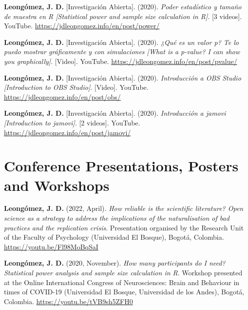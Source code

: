 \documentclass[11pt,a4paper,]{awesome-cv}
\begin{document}
\leavevmode{}%
\textbf{Leongómez, J. D.} {[}Investigación Abierta{]}. (2020).
\emph{{Poder estadístico y tamaño de muestra en R {[}Statistical power
and sample size calculation in R{]}}}. {[}3 videos{]}. YouTube.
\url{https://jdleongomez.info/en/post/power/}

\leavevmode{}%
\textbf{Leongómez, J. D.} {[}Investigación Abierta{]}. (2020).
\emph{{¿Qué es un valor p? Te lo puedo mostrar gráficamente y con
simulaciones {[}What is a p-value? I can show you graphically{]}}}.
{[}Video{]}. YouTube. \url{https://jdleongomez.info/en/post/pvalue/}

\leavevmode{}%
\textbf{Leongómez, J. D.} {[}Investigación Abierta{]}. (2020).
\emph{{Introducción a OBS Studio {[}Introduction to OBS Studio{]}}}.
{[}Video{]}. YouTube. \url{https://jdleongomez.info/en/post/obs/}

\leavevmode{}%
\textbf{Leongómez, J. D.} {[}Investigación Abierta{]}. (2020).
\emph{{Introducción a jamovi {[}Introduction to jamovi{]}}}. {[}2
videos{]}. YouTube. \url{https://jdleongomez.info/en/post/jamovi/}

\endgroup

\hypertarget{conference-presentations-posters-and-workshops}{%
\section{Conference Presentations, Posters and
Workshops}\label{conference-presentations-posters-and-workshops}}

\begingroup
\setlength{\parindent}{-0.5in}
\setlength{\leftskip}{0.5in}

\textbf{Leongómez, J. D.} (2022, April). \emph{How reliable is the
scientific literature? Open science as a strategy to address the
implications of the naturalisation of bad practices and the replication
crisis}. Presentation organised by the Research Unit of the Faculty of
Psychology (Universidad El Bosque), Bogotá, Colombia.
\url{https://youtu.be/Fl98MoBqSaI}

\textbf{Leongómez, J. D.} (2020, November). \emph{How many participants
do I need? Statistical power analysis and sample size calculation in R}.
Workshop presented at the Online International Congress of
Neurosciences: Brain and Behaviour in times of COVID-19 (Universidad El
Bosque, Universidad de los Andes), Bogotá, Colombia.
\url{https://youtu.be/tVB9sh5ZFH0}
\end{document}
